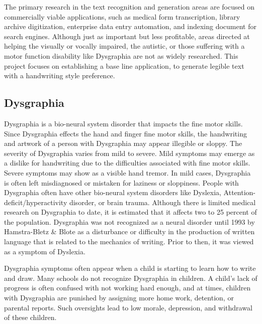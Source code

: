 \documentclass{article}
\begin{document}
The primary research in the text recognition and generation areas are focused on commercially viable applications, such as medical form transcription, library archive digitization, enterprise data entry automation, and indexing document for search engines. Although just as important but less profitable, areas directed at helping the visually or vocally impaired, the autistic, or those suffering with a motor function disability like Dysgraphia are not as widely researched. This project focuses on establishing a base line application, to generate legible text with a handwriting style preference.   

\subsection{Dysgraphia}
Dysgraphia is a bio-neural system disorder that impacts the fine motor skills. Since Dysgraphia effects the hand and finger fine motor skills, the handwriting and artwork of a person with Dysgraphia may appear illegible or sloppy\cite{previous-work-31}. The severity of Dysgraphia varies from mild to severe. Mild symptoms may emerge as a dislike for handwriting due to the difficulties associated with fine motor skills. Severe symptoms may show as a visible hand tremor. In mild cases, Dysgraphia is often left misdiagnosed or mistaken for laziness or sloppiness. People with Dysgraphia often have other bio-neural system disorders like Dyslexia, Attention-deficit/hyperactivity disorder, or brain trauma\cite{Previous-work-32}. Although there is limited medical research on Dysgraphia to date, it is estimated that it affects two to 25 percent of the population. Dysgraphia was not  recognized as a neural disorder until 1993 by Hamstra-Bletz & Blote as a disturbance or difficulty in the production of written language that is related to the mechanics of writing\cite{Dysgraphia_recognized_date}. Prior to then, it was viewed as a symptom of Dyslexia.

Dysgraphia symptoms often appear when a child is starting to learn how to write and draw. Many schools do not recognize Dysgraphia in children. A child's lack of progress is often confused with not working hard enough, and at times, children with Dysgraphia are punished by assigning more home work, detention, or parental reports. Such oversights lead to low morale, depression, and withdrawal of these children\cite{previous-work-29}.
\end{document}
